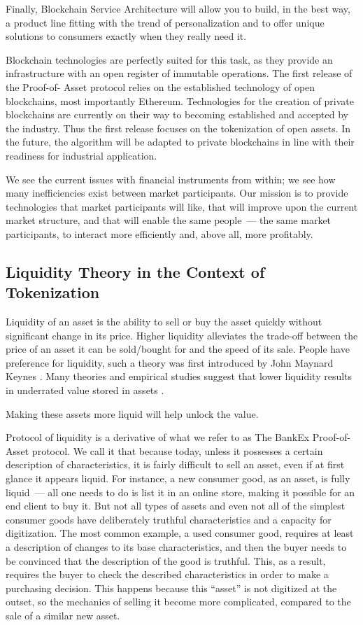 \documentclass{article}
\begin{document}
\begin{multicols}{2}
Finally, Blockchain Service Architecture will allow you to build, in the best way, a product line fitting with the trend of personalization and to offer unique solutions to consumers exactly when they really need it.

Blockchain technologies are perfectly suited for this task, as they provide an infrastructure with an open register of immutable operations. The first release of the Proof-of- Asset protocol relies on the established technology of open blockchains, most importantly Ethereum. Technologies for the creation of private blockchains are currently on their way to becoming established and accepted by the industry. Thus the first release focuses on the tokenization of open assets. In the future, the algorithm will be adapted to private blockchains in line with their readiness for industrial application.

We see the current issues with financial instruments from within; we see how many inefficiencies exist between market participants. Our mission is to provide technologies that market participants will like, that will improve upon the current market structure, and that will enable the same people~--- the same market participants, to interact more efficiently and, above all, more profitably.

\subsection{Liquidity Theory in the Context of Tokenization}

Liquidity of an asset is the ability to sell or buy the asset quickly without significant change in its price. Higher liquidity alleviates the trade-off between the price of an asset it can be sold/bought for and the speed of its sale. People have preference for liquidity, such a theory was first introduced by John Maynard Keynes \cite{keynes2017}. Many theories and empirical studies suggest that lower liquidity results in underrated value stored in assets \cite{amihud2005}. 

Making these assets more liquid will help unlock the value.

Protocol of liquidity is a derivative of what we refer to as The BankEx Proof-of-Asset protocol. We call it that because today, unless it possesses a certain description of characteristics, it is fairly difficult to sell an asset, even if at first glance it appears liquid. For instance, a new consumer good, as an asset, is fully liquid~--- all one needs to do is list it in an online store,  making it possible for an end client to buy it. But not all types of assets and even not all of the simplest consumer goods have deliberately truthful characteristics and a capacity for digitization. The most common example, a used consumer good, requires at least a description of changes to its base characteristics, and then the buyer needs to be convinced that the description of the good is truthful. This, as a result, requires the buyer to check the described characteristics in order to make a purchasing decision. This happens because this “asset” is not digitized at the outset, so the mechanics of selling it become more complicated, compared to the sale of a similar new asset. 


\end{multicols}
\end{document}
